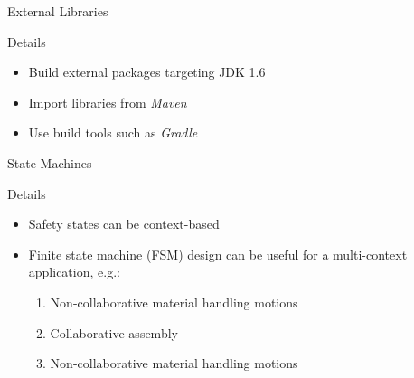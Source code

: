 \documentclass{beamer}
\begin{document}
\begin{frame}[fragile]{External Libraries}

  \begin{block}{Details}
    \begin{itemize}
      \item Build external packages targeting JDK 1.6
      \item Import libraries from \textit{Maven}
      \item Use build tools such as \textit{Gradle}
    \end{itemize}
  \end{block}
\end{frame}

\begin{frame}[fragile]{State Machines}

  \begin{block}{Details}
    \begin{itemize}
      \item Safety states can be context-based
      \item Finite state machine (FSM) design can be useful for a multi-context application, e.g.:
      \begin{enumerate}
        \item Non-collaborative material handling motions
        \item Collaborative assembly
        \item Non-collaborative material handling motions
      \end{enumerate}
    \end{itemize}
  \end{block}
\end{frame}
\end{document}
